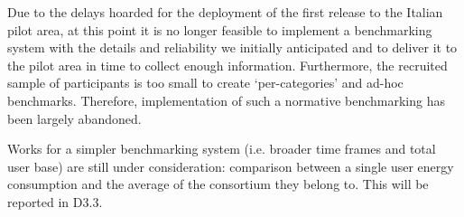 Due to the delays hoarded for the deployment of the first release to the Italian pilot area, at this point it is no longer feasible to implement a benchmarking system with the details and reliability we initially anticipated and to deliver it to the pilot area in time to collect enough information. Furthermore, the recruited sample of participants is too small to create `per-categories' and ad-hoc benchmarks. Therefore, implementation of such a normative benchmarking has been largely abandoned.

Works for a simpler benchmarking system (i.e. broader time frames and total user base) are still under consideration: comparison between a single user energy consumption and the average of the consortium they belong to. This will be reported in D3.3. 

